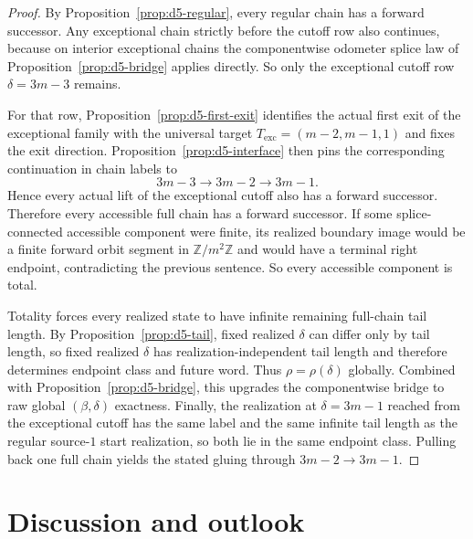 \documentclass[11pt]{article}
\begin{document}
\begin{proof}
By Proposition~\ref{prop:d5-regular}, every regular chain has a forward successor.
Any exceptional chain strictly before the cutoff row also continues, because on interior exceptional chains the componentwise odometer splice law of Proposition~\ref{prop:d5-bridge} applies directly.
So only the exceptional cutoff row $\delta=3m-3$ remains.

For that row, Proposition~\ref{prop:d5-first-exit} identifies the actual first exit of the exceptional family with the universal target $T_{\mathrm{exc}}=(m-2,m-1,1)$ and fixes the exit direction.
Proposition~\ref{prop:d5-interface} then pins the corresponding continuation in chain labels to
\[
3m-3 \to 3m-2 \to 3m-1.
\]
Hence every actual lift of the exceptional cutoff also has a forward successor.
Therefore every accessible full chain has a forward successor.
If some splice-connected accessible component were finite, its realized boundary image would be a finite forward orbit segment in $\mathbb Z/m^2\mathbb Z$ and would have a terminal right endpoint, contradicting the previous sentence.
So every accessible component is total.

Totality forces every realized state to have infinite remaining full-chain tail length.
By Proposition~\ref{prop:d5-tail}, fixed realized $\delta$ can differ only by tail length, so fixed realized $\delta$ has realization-independent tail length and therefore determines endpoint class and future word.
Thus $\rho=\rho(\delta)$ globally.
Combined with Proposition~\ref{prop:d5-bridge}, this upgrades the componentwise bridge to raw global $(\beta,\delta)$ exactness.
Finally, the realization at $\delta=3m-1$ reached from the exceptional cutoff has the same label and the same infinite tail length as the regular source-$1$ start realization, so both lie in the same endpoint class.
Pulling back one full chain yields the stated gluing through $3m-2\to 3m-1$.
\end{proof}



\section{Discussion and outlook}\label{sec:discussion}
\end{document}

